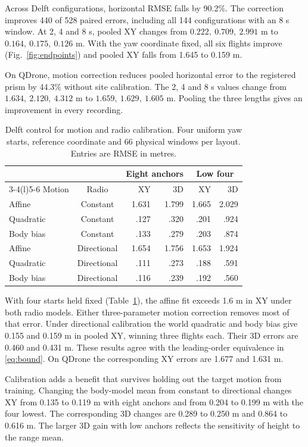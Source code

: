 \documentclass{IEEEtaes}
\begin{document}
Across Delft configurations, horizontal RMSE falls by 90.2\%. The correction improves 440 of 528 paired errors, including all 144 configurations with an 8 s window. At 2, 4 and 8 s, pooled XY changes from \(0.222,\ 0.709,\ 2.991\) m to \(0.164,\ 0.175,\ 0.126\) m. With the yaw coordinate fixed, all six flights improve (Fig.~\ref{fig:endpoints}) and pooled XY falls from 1.645 to 0.159 m.

On QDrone, motion correction reduces pooled horizontal error to the registered prism by 44.3\% without site calibration. The 2, 4 and 8 s values change from \(1.634,\ 2.120,\ 4.312\) m to \(1.659,\ 1.629,\ 1.605\) m. Pooling the three lengths gives an improvement in every recording.

\begin{table}[t]
\caption{Delft control for motion and radio calibration. Four uniform yaw starts, reference coordinate and 66 physical windows per layout. Entries are RMSE in metres.}
\label{tab:motion}\centering\tablefont
\begin{tabular}{@{}lcrrrr@{}}
\toprule
& &\multicolumn{2}{c}{Eight anchors}&\multicolumn{2}{c}{Low four}\\
\cmidrule(lr){3-4}\cmidrule(l){5-6}
Motion&Radio&XY&3D&XY&3D\\\midrule
Affine&Constant&1.631&1.799&1.665&2.029\\
Quadratic&Constant&.127&.320&.201&.924\\
Body bias&Constant&.133&.279&.203&.874\\
Affine&Directional&1.654&1.756&1.653&1.924\\
Quadratic&Directional&.111&.273&.188&.591\\
Body bias&Directional&.116&.239&.192&.560\\
\bottomrule
\end{tabular}
\end{table}

With four starts held fixed (Table~\ref{tab:motion}), the affine fit exceeds 1.6 m in XY under both radio models. Either three-parameter motion correction removes most of that error. Under directional calibration the world quadratic and body bias give 0.155 and 0.159 m in pooled XY, winning three flights each. Their 3D errors are 0.460 and 0.431 m. These results agree with the leading-order equivalence in \eqref{eq:bound}. On QDrone the corresponding XY errors are 1.677 and 1.631 m.

Calibration adds a benefit that survives holding out the target motion from training. Changing the body-model mean from constant to directional changes XY from 0.135 to 0.119 m with eight anchors and from 0.204 to 0.199 m with the four lowest. The corresponding 3D changes are 0.289 to 0.250 m and 0.864 to 0.616 m. The larger 3D gain with low anchors reflects the sensitivity of height to the range mean.
\end{document}
